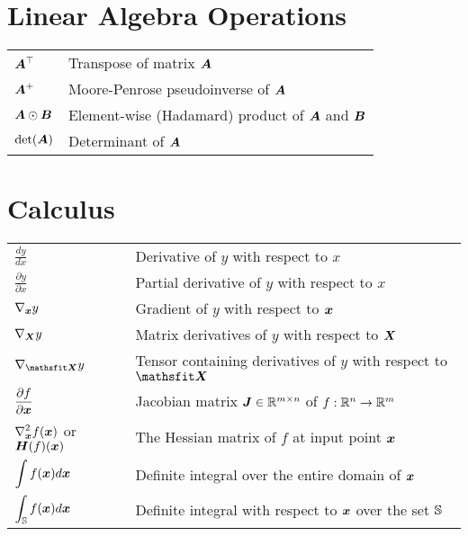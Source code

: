 \section*{Linear Algebra Operations}
\def\arraystretch{1.5}
\begin{longtable}{p{}p{}}
$\displaystyle {\bm{A}}^\top$ & Transpose of matrix ${\bm{A}}$ \\
$\displaystyle {\bm{A}}^+$ & Moore-Penrose pseudoinverse of ${\bm{A}}$\\
$\displaystyle {\bm{A}} \odot {\bm{B}} $ & Element-wise (Hadamard) product of ${\bm{A}}$ and ${\bm{B}}$ \\
$\displaystyle \mathrm{det}({\bm{A}})$ & Determinant of ${\bm{A}}$ \\
\end{longtable}
%
\section*{Calculus}
\def\arraystretch{1.5}
\begin{longtable}{p{}p{}}
$\displaystyle\frac{d y} {d x}$ & Derivative of $y$ with respect to $x$\\ [2ex]
$\displaystyle \frac{\partial y} {\partial x} $ & Partial derivative of $y$ with respect to $x$ \\
$\displaystyle \nabla_{\bm{x}} y $ & Gradient of $y$ with respect to ${\bm{x}}$ \\
$\displaystyle \nabla_{\bm{X}} y $ & Matrix derivatives of $y$ with respect to ${\bm{X}}$ \\
$\displaystyle \nabla_\tX y $ & Tensor containing derivatives of $y$ with respect to $\tX$ \\
$\displaystyle \frac{\partial f}{\partial {\bm{x}}} $ & Jacobian matrix ${\bm{J}} \in \mathbb{R}^{m\times n}$ of $f: \mathbb{R}^n \rightarrow \mathbb{R}^m$\\
$\displaystyle \nabla_{\bm{x}}^2 f({\bm{x}})$ or $\displaystyle {\bm{H}}( f)({\bm{x}})$ & The Hessian matrix of $f$ at input point ${\bm{x}}$\\
$\displaystyle \int f({\bm{x}}) d{\bm{x}} $ & Definite integral over the entire domain of ${\bm{x}}$ \\
$\displaystyle \int_{\mathbb{S}} f({\bm{x}}) d{\bm{x}}$ & Definite integral with respect to ${\bm{x}}$ over the set ${\mathbb{S}}$ \\
\end{longtable}
%
%
%
%
